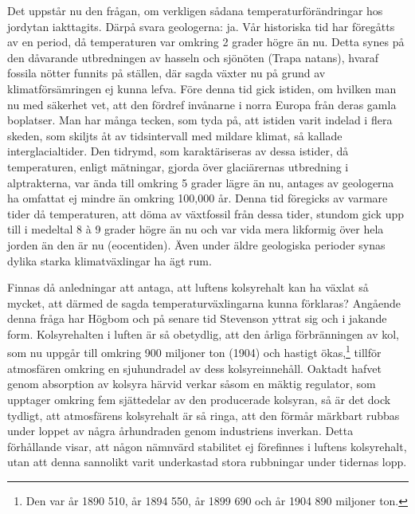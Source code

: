 \documentclass[a4paper, 12pt, oneside, swedish]{article}
\begin{document}
Det uppstår nu den frågan, om verkligen sådana temperaturförändringar hos jordytan iakttagits. Därpå svara geologerna: ja. Vår historiska tid har föregåtts av en period, då temperaturen var omkring 2 grader högre än nu. Detta synes på den dåvarande utbredningen av hasseln och sjönöten (Trapa natans), hvaraf fossila nötter funnits på ställen, där sagda växter nu på grund av klimatförsämringen ej kunna lefva. Före denna tid gick istiden, om hvilken man nu med säkerhet vet, att den fördref invånarne i norra Europa från deras gamla boplatser. Man har många tecken, som tyda på, att istiden varit indelad i flera skeden, som skiljts åt av tidsintervall med mildare klimat, så kallade interglacialtider. Den tidrymd, som karaktäriseras av dessa istider, då temperaturen, enligt mätningar, gjorda över glaciärernas utbredning i alptrakterna, var ända till omkring 5 grader lägre än nu, antages av geologerna ha omfattat ej mindre än omkring 100,000 år. Denna tid föregicks av varmare tider då temperaturen, att döma av växtfossil från dessa tider, stundom gick upp till i medeltal 8 à 9 grader högre än nu och var vida mera likformig över hela jorden än den är nu (eocentiden). Även under äldre geologiska perioder synas dylika starka klimatväxlingar ha ägt rum.

Finnas då anledningar att antaga, att luftens kolsyrehalt kan ha växlat så mycket, att därmed de sagda temperaturväxlingarna kunna förklaras? Angående denna fråga har Högbom och på senare tid Stevenson yttrat sig och i jakande form. Kolsyrehalten i luften är så obetydlig, att den årliga förbränningen av kol, som nu uppgår till omkring 900 miljoner ton (1904) och hastigt ökas,\footnote{Den var år 1890 510, år 1894 550, år 1899 690 och år 1904 890 miljoner ton.} tillför atmosfären omkring en sjuhundradel av dess kolsyreinnehåll. Oaktadt hafvet genom absorption av kolsyra härvid verkar såsom en mäktig regulator, som upptager omkring fem sjättedelar av den producerade kolsyran, så är det dock tydligt, att atmosfärens kolsyrehalt är så ringa, att den förmår märkbart rubbas under loppet av några århundraden genom industriens inverkan. Detta förhållande visar, att någon nämnvärd stabilitet ej förefinnes i luftens kolsyrehalt, utan att denna sannolikt varit underkastad stora rubbningar under tidernas lopp.
\end{document}
